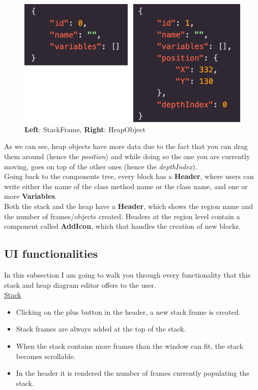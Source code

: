 \documentclass[]{usiinfbachelorproject}
\begin{document}
\begin{figure}[h!]
\centering
\includegraphics[scale=.3]{figures/blocks_data.png}
\caption {\textbf{Left}: StackFrame, \textbf{Right}: HeapObject}
\label{tree}
\end{figure}

\noindent As we can see, heap objects have more data due to the fact that you can drag them around (hence the \emph{position}) and while doing so the one you are currently moving, goes on top of the other ones (hence the \emph{depthIndex}).\\
Going back to the components tree, every block has a \textbf{Header}, where users can write either the name of the class method name or the class name, and one or more \textbf{Variables}.\\
Both the stack and the heap have a \textbf{Header}, which shows the region name and the number of frames/objects created. Headers at the region level contain a component called \textbf{AddIcon}, which that handles the creation of new blocks.

\subsection{UI functionalities}

In this subsection I am going to walk you through every functionality that this stack and heap diagram editor offers to the user.\\

\ul{Stack}

\begin{itemize}
	\item Clicking on the plus button in the header, a new stack frame is created.
	\item Stack frames are always added at the top of the stack.
	\item When the stack contains more frames than the window can fit, the stack becomes scrollable. 
	\item In the header it is rendered the number of frames currently populating the stack.
\end{itemize}\
\end{document}
